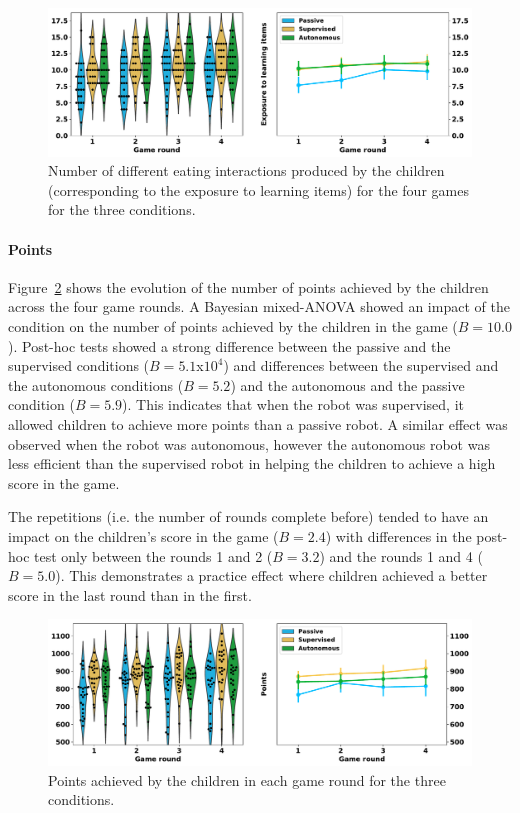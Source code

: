 \begin{figure}[ht]
	\includegraphics[width=1\linewidth]{d_eat.pdf}
	\centering
	\caption{Number of different eating interactions produced by the children (corresponding to the exposure to learning items) for the four games for the three conditions.}
	\label{fig:tutoring_d_eat}
\end{figure}

\paragraph{Points}

Figure~\ref{fig:tutoring_points} shows the evolution of the number of points achieved by the children across the four game rounds. A Bayesian mixed-ANOVA showed an impact of the condition on the number of points achieved by the children in the game ($B=10.0$). Post-hoc tests showed a strong difference between the passive and the supervised conditions ($B=5.1$x$10^4$) and differences between the supervised and the autonomous conditions ($B=5.2$) and the autonomous and the passive condition ($B=5.9$). This indicates that when the robot was supervised, it allowed children to achieve more points than a  passive robot. A similar effect was observed when the robot was autonomous, however the autonomous robot was less efficient than the supervised robot in helping the children to achieve a high score in the game.

The repetitions (i.e. the number of rounds complete before) tended to have an impact on the children's score in the game ($B=2.4$) with differences in the post-hoc test only between the rounds 1 and 2 ($B=3.2$) and the rounds 1 and 4 ($B=5.0$). This demonstrates a practice effect where children achieved a better score in the last round than in the first.

\begin{figure}[ht]
	\includegraphics[width=1\linewidth]{points.pdf}
	\centering
	\caption{Points achieved by the children in each game round for the three conditions.}
	\label{fig:tutoring_points}
\end{figure}

